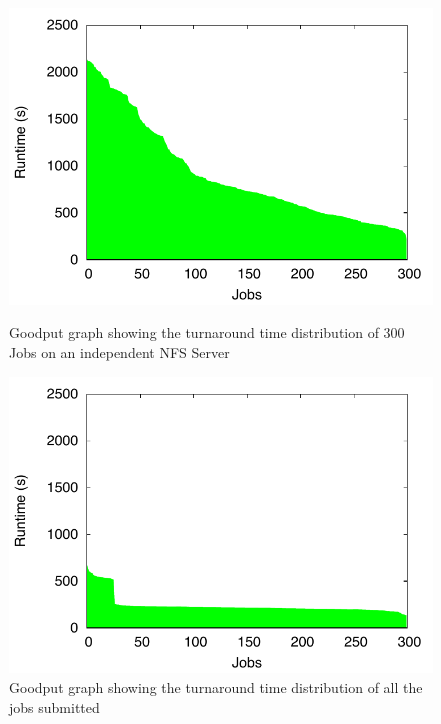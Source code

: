 \documentclass[ms,electronic,double]{nuthesis}
\begin{document}
\begin{figure}[htbp!]

\begin{center}
\includegraphics{images/nfs_tusker_goodput}
\caption{Goodput graph showing the turnaround time distribution of 300 Jobs on an independent NFS Server}
\label{fig:nfs_tusker_goodput}
\end{center}


\begin{center}
\includegraphics{images/nfs_coscheduler_tusker_goodput}
\caption{Goodput graph showing the turnaround time distribution of all the jobs submitted}
\label{fig:nfs_coscheduler_tusker_goodput}
\end{center}


\end{figure}
\FloatBarrier
\end{document}
